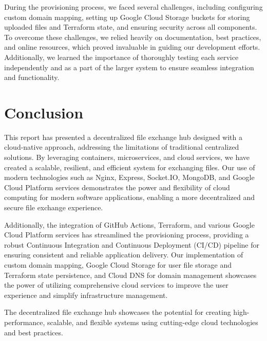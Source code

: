 \documentclass[a4paper,fleqn]{cas-dc}
\begin{document}
During the provisioning process, we faced several challenges, including configuring custom domain mapping, setting up Google Cloud Storage buckets for storing uploaded files and Terraform state, and ensuring security across all components. To overcome these challenges, we relied heavily on documentation, best practices, and online resources, which proved invaluable in guiding our development efforts. Additionally, we learned the importance of thoroughly testing each service independently and as a part of the larger system to ensure seamless integration and functionality.

\section{Conclusion}

This report has presented a decentralized file exchange hub designed with a cloud-native approach, addressing the limitations of traditional centralized solutions. By leveraging containers, microservices, and cloud services, we have created a scalable, resilient, and efficient system for exchanging files. Our use of modern technologies such as Nginx, Express, Socket.IO, MongoDB, and Google Cloud Platform services demonstrates the power and flexibility of cloud computing for modern software applications, enabling a more decentralized and secure file exchange experience.

Additionally, the integration of GitHub Actions, Terraform, and various Google Cloud Platform services has streamlined the provisioning process, providing a robust Continuous Integration and Continuous Deployment (CI/CD) pipeline for ensuring consistent and reliable application delivery. Our implementation of custom domain mapping, Google Cloud Storage for user file storage and Terraform state persistence, and Cloud DNS for domain management showcases the power of utilizing comprehensive cloud services to improve the user experience and simplify infrastructure management.

The decentralized file exchange hub showcases the potential for creating high-performance, scalable, and flexible systems using cutting-edge cloud technologies and best practices.

%
%
%


\end{document}
